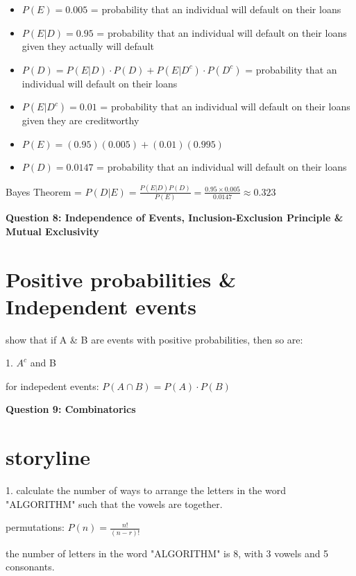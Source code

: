 \documentclass{article}
\begin{document}
\begin{itemize}
    \item \(P(E) = 0.005\) = probability that an individual will default on their loans
    \item \(P(E|D) = 0.95\) = probability that an individual will default on their loans given they actually will default
    \item \(P(D) = P(E|D) \cdot P(D) + P(E|D^c) \cdot P(D^c)\) = probability that an individual will default on their loans
    \item \(P(E|D^c) = 0.01\) = probability that an individual will default on their loans given they are creditworthy
    \item \(P(E) = (0.95)(0.005) + (0.01)(0.995)\)
    \item \(P(D) = 0.0147\) = probability that an individual will default on their loans
\end{itemize}

Bayes Theorem = \(P(D|E) = \frac{P(E|D)P(D)}{P(E)} = \frac{0.95 \times 0.005}{0.0147} \approx 0.323\)

\begin{center}
    \large \textbf{Question 8: Independence of Events, Inclusion-Exclusion Principle \& Mutual Exclusivity}
\end{center}

\section{Positive probabilities \& Independent events}
show that if A \& B are events with positive probabilities, then so are:

1. \(A^c\) and B 

for indepedent events: \(P(A \cap B) = P(A) \cdot P(B)\)

\begin{center}
    \large \textbf{Question 9: Combinatorics}
\end{center}

\section{storyline}

1. calculate the number of ways to arrange the letters in the word "ALGORITHM" such that the vowels are together.

permutations: \(P(n) = \frac{n!}{(n-r)!}\)

the number of letters in the word "ALGORITHM" is 8, with 3 vowels and 5 consonants.
\end{document}
